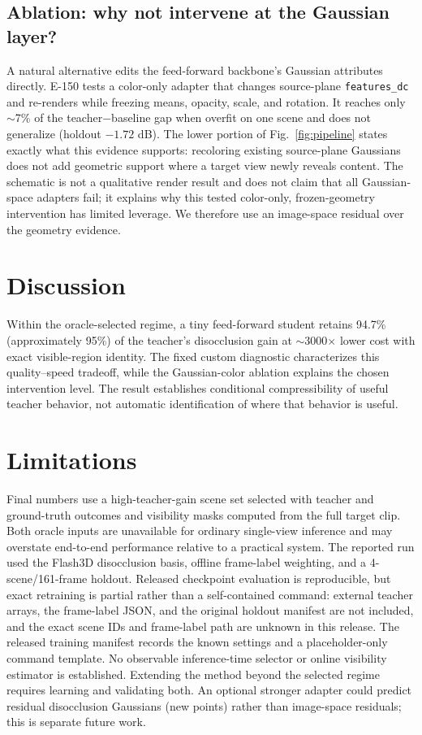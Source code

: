 \documentclass[10pt,twocolumn,letterpaper]{article}
\begin{document}
\subsection{Ablation: why not intervene at the Gaussian layer?}
A natural alternative edits the feed-forward backbone's Gaussian attributes
directly. E-150 tests a color-only adapter that changes source-plane
\texttt{features\_dc} and re-renders while freezing means, opacity, scale, and
rotation. It reaches only $\sim$7\% of the teacher$-$baseline gap when overfit on
one scene and does not generalize (holdout $-1.72$ dB). The lower portion of
Fig.~\ref{fig:pipeline} states exactly what this evidence supports: recoloring
existing source-plane Gaussians does not add geometric support where a target
view newly reveals content. The schematic is not a qualitative render result and
does not claim that all Gaussian-space adapters fail; it explains why this tested
color-only, frozen-geometry intervention has limited leverage. We therefore use
an image-space residual over the geometry evidence.

\section{Discussion}
\label{sec:disc}
Within the oracle-selected regime, a tiny feed-forward student retains 94.7\%
(approximately 95\%) of the teacher's disocclusion gain at $\sim$3000$\times$
lower cost with exact visible-region identity. The fixed custom diagnostic
characterizes this quality--speed tradeoff, while the Gaussian-color ablation
explains the chosen intervention level. The result establishes conditional
compressibility of useful teacher behavior, not automatic identification of
where that behavior is useful.

\section{Limitations}
\label{sec:limits}
Final numbers use a high-teacher-gain scene set selected with teacher and
ground-truth outcomes and visibility masks computed from the full target clip.
Both oracle inputs are unavailable for ordinary single-view inference and may
overstate end-to-end performance relative to a practical system. The reported run
used the Flash3D disocclusion basis, offline frame-label weighting, and a
4-scene/161-frame holdout. Released checkpoint evaluation is reproducible, but
exact retraining is partial rather than a self-contained command: external teacher
arrays, the frame-label JSON, and the original holdout manifest are not included,
and the exact scene IDs and frame-label path are unknown in this release. The
released training manifest records the known settings and a placeholder-only
command template. No observable inference-time selector or online visibility
estimator is established. Extending the method beyond the selected regime requires
learning and validating both. An optional stronger adapter could predict residual
disocclusion Gaussians (new points) rather than image-space residuals; this is
separate future work.
\end{document}
